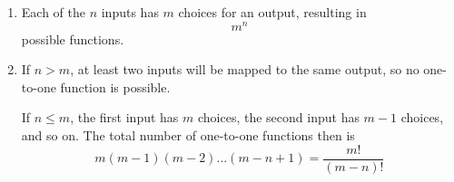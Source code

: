 \begin{enumerate}[label=(\alph*)]
\item Each of the $n$ inputs has $m$ choices for an output, resulting in 
$$m^{n}$$ possible functions.

\item If $n > m$, at least two inputs will be mapped to the same output, 
so no one-to-one function is possible. 
  
  If $n \leq m$, the first input has $m$ choices, the second input has $m - 1$ 
  choices, and so on. The total number of one-to-one functions then is 
  $$m(m-1)(m-2)\dots(m-n+1) = \frac{m!}{(m-n)!} $$
\end{enumerate}
